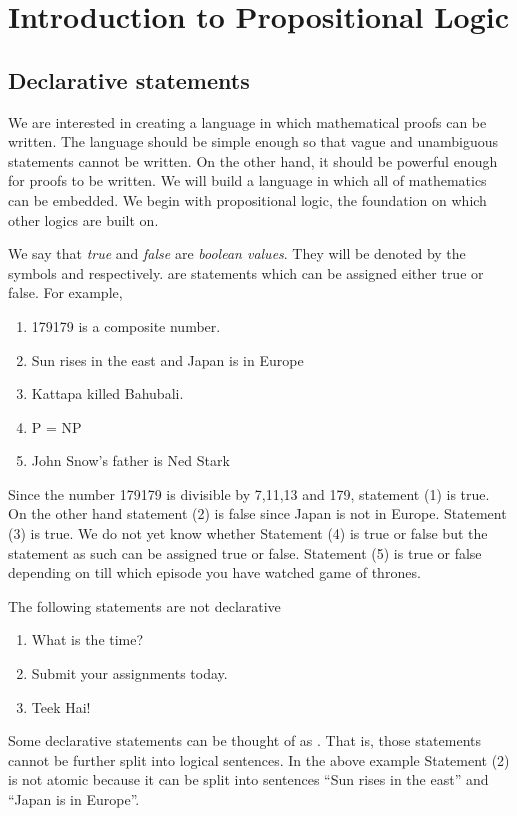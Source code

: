 
\chapter{Introduction to Propositional Logic}
\section{Declarative statements}
We are interested in creating a language in which mathematical proofs can be written. The language should be simple enough so that vague and unambiguous statements cannot be written. On the other hand, it should be powerful enough for proofs to be written. We will build a language in which all of mathematics can be embedded. We begin with propositional logic, the foundation on which other logics are built on.

We say that \emph{true} and \emph{false} are \emph{boolean values}. They will be denoted by the symbols \true\/ and \false\/ respectively.  are statements which can be assigned either true or false. For example,
\begin{enumerate}
\item 179179 is a composite number.
\item Sun rises in the east and Japan is in Europe
\item Kattapa killed Bahubali.
\item P = NP
\item John Snow's father is Ned Stark
\end{enumerate}
Since the number 179179 is divisible by 7,11,13 and 179, statement (1) is true. On the other hand statement (2) is false since Japan is not in Europe. Statement (3) is true. We do not yet know whether Statement (4) is true or false but the statement as such can be assigned true or false. Statement (5) is true or false depending on till which episode you have watched game of thrones. 

The following statements are not declarative 	
\begin{enumerate}
\item What is the time?
\item Submit your assignments today.
\item Teek Hai!
\end{enumerate}

Some declarative statements can be thought of as . That is, those statements cannot be further split into logical sentences. In the above example Statement (2) is not atomic because it can be split into sentences ``Sun rises in the east'' and ``Japan is in Europe''.

